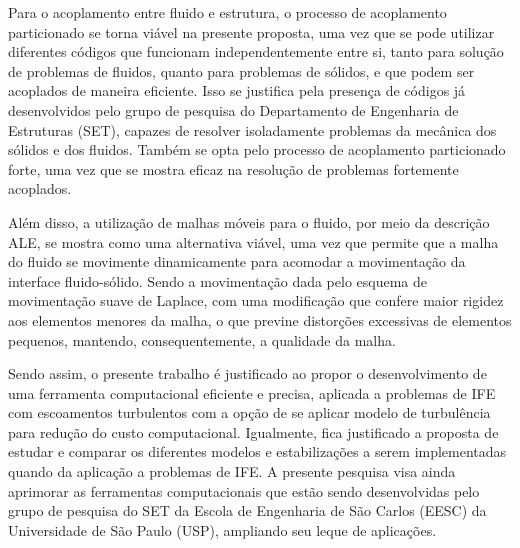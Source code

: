 Para o acoplamento entre fluido e estrutura, o processo de acoplamento particionado se torna viável na presente proposta, uma vez que se pode utilizar diferentes códigos que funcionam independentemente entre si, tanto para solução de problemas de fluidos, quanto para problemas de sólidos, e que podem ser acoplados de maneira eficiente. Isso se justifica pela presença de códigos já desenvolvidos pelo grupo de pesquisa do Departamento de Engenharia de Estruturas (SET), capazes de resolver isoladamente problemas da mecânica dos sólidos e dos fluidos. Também se opta pelo processo de acoplamento particionado forte, uma vez que se mostra eficaz na resolução de problemas fortemente acoplados.

Além disso, a utilização de malhas móveis para o fluido, por meio da descrição ALE, se mostra como uma alternativa viável, uma vez que permite que a malha do fluido se movimente dinamicamente para acomodar a movimentação da interface fluido-sólido. Sendo a movimentação dada pelo esquema de movimentação suave de Laplace, com uma modificação que confere maior rigidez aos elementos menores da malha, o que previne distorções excessivas de elementos pequenos, mantendo, consequentemente, a qualidade da malha.

Sendo assim, o presente trabalho é justificado ao propor o desenvolvimento de uma ferramenta computacional eficiente e precisa, aplicada a problemas de IFE com escoamentos turbulentos com a opção de se aplicar modelo de turbulência para redução do custo computacional. Igualmente, fica justificado a proposta de estudar e comparar os diferentes modelos e estabilizações a serem implementadas quando da aplicação a problemas de IFE. A presente pesquisa visa ainda aprimorar as ferramentas computacionais que estão sendo desenvolvidas pelo grupo de pesquisa do SET da Escola de Engenharia de São Carlos (EESC) da Universidade de São Paulo (USP), ampliando seu leque de aplicações.

